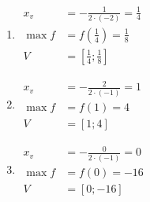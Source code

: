 \documentclass[11pt,a4paper]{article}
\begin{document}
\begin{enumerate}[label={},itemsep=9pt]
\item[\textbf{D007}] \(\displaystyle \begin{aligned}x_v&=-\frac{1}{2\cdot(-2)}=\frac{1}{4}\\\max f&=f(\frac{1}{4})=\frac{1}{8}\\V&=[\frac{1}{4};\frac{1}{8}]\end{aligned}\)\par
\item[\textbf{D008}] \(\displaystyle \begin{aligned}x_v&=-\frac{2}{2\cdot(-1)}=1\\\max f&=f(1)=4\\V&=[1;4]\end{aligned}\)\par
\item[\textbf{D009}] \(\displaystyle \begin{aligned}x_v&=-\frac{0}{2\cdot(-1)}=0\\\max f&=f(0)=-16\\V&=[0;-16]\end{aligned}\)\par
\end{enumerate}
\end{document}
